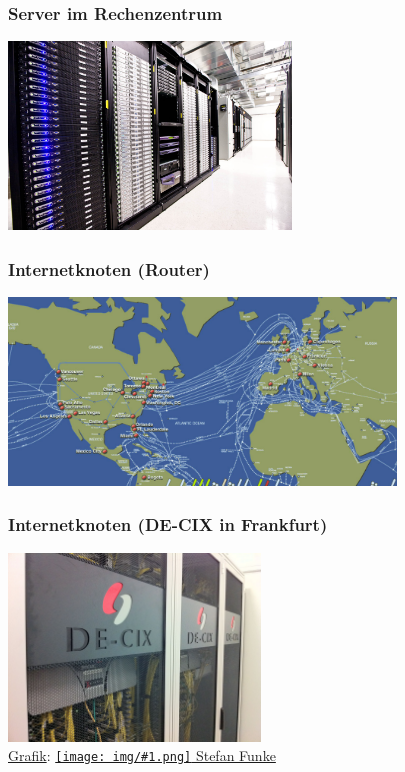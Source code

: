 \documentclass[12pt, xcolor={svgnames,table}]{beamer}
\newcommand{\cc}[1]{\texttt{[image: img/\#1.png]}\hspace{1mm}}
\begin{document}
\begin{frame}
    \frametitle{Server im Rechenzentrum}
    \begin{center}
      \includegraphics[height=5cm]{img/data_center.jpg}
    \end{center}
\end{frame}

\begin{frame}
    \frametitle{Internetknoten (Router)}
    \begin{center}
      \includegraphics[height=5cm]{img/internet_cable_map.png}
    \end{center}
\end{frame}

\begin{frame}
    \frametitle{Internetknoten (DE-CIX in Frankfurt)}
    \begin{center}
      \includegraphics[height=5cm]{img/de_cix.jpg}
      \\{\small \href{https://de.wikipedia.org/wiki/DE-CIX\#/media/File:DE-CIX\_GERMANY\_-\_Switch\_Rack\_\%286218137120\%29.jpg}{Grafik}: \href{https://creativecommons.org/licenses/by-sa/2.0/}{\cc{by-sa} Stefan Funke}}
    \end{center}
\end{frame}
\end{document}
